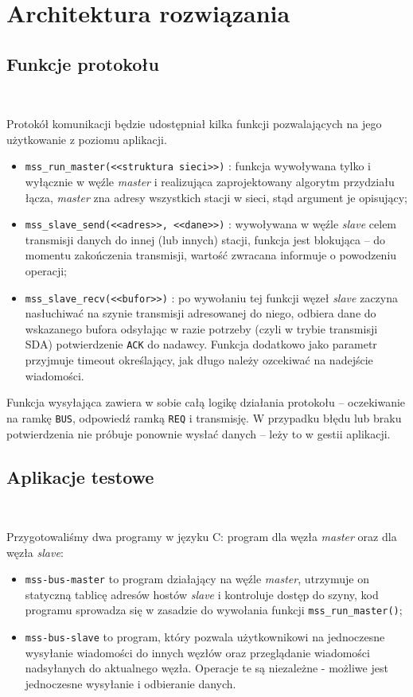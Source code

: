 \documentclass[a4paper,12pt]{article}
\begin{document}
\section{Architektura rozwiązania}

\subsection{Funkcje protokołu}\

Protokół komunikacji będzie udostępniał kilka funkcji pozwalających na jego
użytkowanie z poziomu aplikacji.
\begin{itemize}
  \item \texttt{mss\_run\_master(\textnormal{<<struktura sieci>>})} : funkcja
        wywoływana tylko i wyłącznie w węźle \emph{master} i realizująca
        zaprojektowany algorytm przydziału łącza, \emph{master} zna adresy
        wszystkich stacji w sieci, stąd argument je opisujący;
  \item \texttt{mss\_slave\_send(\textnormal{<<adres>>}, \textnormal{<<dane>>})}
        : wywoływana w węźle \emph{slave} celem transmisji danych do innej
        (lub innych) stacji, funkcja jest blokująca -- do momentu zakończenia
        transmisji, wartość zwracana informuje o powodzeniu operacji;
  \item \texttt{mss\_slave\_recv(\textnormal{<<bufor>>})} : po wywołaniu tej
        funkcji węzeł \emph{slave} zaczyna nasłuchiwać na szynie transmisji
        adresowanej do niego, odbiera dane do wskazanego bufora odsyłając
        w razie potrzeby (czyli w trybie transmisji SDA) potwierdzenie
        \texttt{ACK} do nadawcy. Funkcja dodatkowo jako parametr przyjmuje
        timeout określający, jak długo należy ozcekiwać na nadejście
        wiadomości.
\end{itemize}
Funkcja wysyłająca zawiera w sobie całą logikę działania protokołu --
oczekiwanie na ramkę \texttt{BUS}, odpowiedź ramką \texttt{REQ} i transmisję.
W przypadku błędu lub braku potwierdzenia nie próbuje ponownie wysłać danych
-- leży to w gestii aplikacji.

\subsection{Aplikacje testowe}\

Przygotowaliśmy dwa programy w języku C: program dla węzła \emph{master}
oraz dla węzła \emph{slave}:
\begin{itemize}
    \item \texttt{mss-bus-master} to program działający na węźle
          \emph{master}, utrzymuje on statyczną tablicę adresów hostów
          \emph{slave} i kontroluje dostęp do szyny, kod programu sprowadza
          się w zasadzie do wywołania funkcji \texttt{mss\_run\_master()};
    \item \texttt{mss-bus-slave} to program, który pozwala użytkownikowi
          na jednoczesne wysyłanie wiadomości do innych węzłów oraz
          przeglądanie wiadomości nadsyłanych do aktualnego węzła. Operacje
          te są niezależne - możliwe jest jednoczesne wysyłanie i odbieranie
          danych.
\end{itemize}
\end{document}

